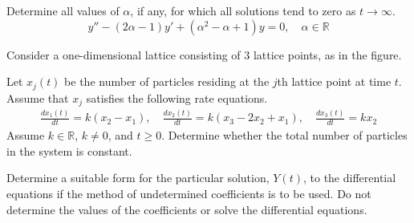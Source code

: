 \documentclass[12pt]{exam}
\begin{document}
\begin{questions}
    \newpage \InitialsLeft

    \question[2] Determine all values of $\alpha$, if any, for which all solutions tend to zero as $t\to\infty$. $$y'' - (2\alpha - 1) y' + (\alpha^2-\alpha+1) y = 0, \quad \alpha \in \mathbb R$$ \vspace{5cm}  %
    
    
    
    \question[3] Consider a one-dimensional lattice consisting of $3$ lattice points, as in the figure.
    
        \begin{center}
        \end{center}  
        
        Let $x_j(t)$ be the number of particles residing at the $j$th lattice point at time $t$. Assume that $x_j$ satisfies the following rate equations.
        \begin{align*} 
            \frac{dx_1(t)}{dt} = k(x_2 - x_1) , \quad 
            \frac{dx_2(t)}{dt} = k(x_3 - 2 x_2 + x_1 ) , \quad 
            \frac{dx_3(t)}{dt} = kx_2 
        \end{align*} 
        Assume $k \in \mathbb R$, $k \ne 0$, and $t \ge 0$. Determine whether the total number of particles in the system is constant. 


    \newpage \InitialsRight
    \question[6]  Determine a suitable form for the particular solution, $Y(t)$, to the differential equations if the method of undetermined coefficients is to be used. Do not determine the values of the coefficients or solve the differential equations. 
    \begin{parts}

\end{parts}
\end{questions}
\end{document}
